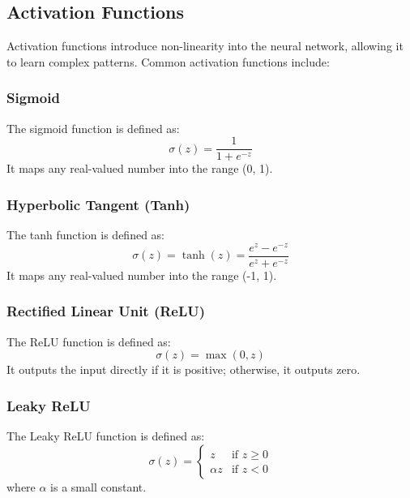 \documentclass{report}
\begin{document}
        \subsection{Activation Functions}
        
        Activation functions introduce non-linearity into the neural network, allowing it to learn complex patterns. Common activation functions include:
        
        \subsubsection{Sigmoid}
        
        The sigmoid function is defined as:
        \begin{equation}
        \sigma(z) = \frac{1}{1 + e^{-z}}
        \end{equation}
        It maps any real-valued number into the range (0, 1).
        
        \subsubsection{Hyperbolic Tangent (Tanh)}
        
        The tanh function is defined as:
        \begin{equation}
        \sigma(z) = \tanh(z) = \frac{e^z - e^{-z}}{e^z + e^{-z}}
        \end{equation}
        It maps any real-valued number into the range (-1, 1).
        
        \subsubsection{Rectified Linear Unit (ReLU)}
        
        The ReLU function is defined as:
        \begin{equation}
        \sigma(z) = \max(0, z)
        \end{equation}
        It outputs the input directly if it is positive; otherwise, it outputs zero.
        
        \subsubsection{Leaky ReLU}
        
        The Leaky ReLU function is defined as:
        \begin{equation}
        \sigma(z) = \begin{cases}
        z & \text{if } z \geq 0 \\
        \alpha z & \text{if } z < 0
        \end{cases}
        \end{equation}
        where \( \alpha \) is a small constant.
        
\end{document}
